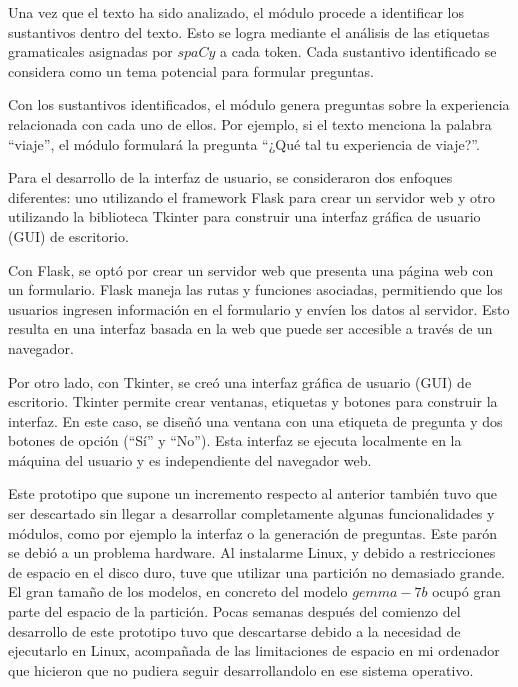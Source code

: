 Una vez que el texto ha sido analizado, el módulo procede a identificar los sustantivos dentro del texto. Esto se logra mediante el análisis de las etiquetas gramaticales asignadas por $spaCy$ a cada token. Cada sustantivo identificado se considera como un tema potencial para formular preguntas.

Con los sustantivos identificados, el módulo genera preguntas sobre la experiencia relacionada con cada uno de ellos. Por ejemplo, si el texto menciona la palabra ``viaje'', el módulo formulará la pregunta ``¿Qué tal tu experiencia de viaje?''.

Para el desarrollo de la interfaz de usuario, se consideraron dos enfoques diferentes: uno utilizando el framework Flask para crear un servidor web y otro utilizando la biblioteca Tkinter para construir una interfaz gráfica de usuario (GUI) de escritorio.

Con Flask, se optó por crear un servidor web que presenta una página web con un formulario. Flask maneja las rutas y funciones asociadas, permitiendo que los usuarios ingresen información en el formulario y envíen los datos al servidor. Esto resulta en una interfaz basada en la web que puede ser accesible a través de un navegador.

Por otro lado, con Tkinter, se creó una interfaz gráfica de usuario (GUI) de escritorio. Tkinter permite crear ventanas, etiquetas y botones para construir la interfaz. En este caso, se diseñó una ventana con una etiqueta de pregunta y dos botones de opción (``Sí'' y ``No''). Esta interfaz se ejecuta localmente en la máquina del usuario y es independiente del navegador web.

Este prototipo que supone un incremento respecto al anterior también tuvo que ser descartado sin llegar a desarrollar completamente algunas funcionalidades y módulos, como por ejemplo la interfaz o la generación de preguntas. Este parón se debió a un problema hardware. Al instalarme Linux, y debido a restricciones de espacio en el disco duro, tuve que utilizar una partición no demasiado grande. El gran tamaño de los modelos, en concreto del modelo $gemma-7b$ ocupó gran parte del espacio de la partición. Pocas semanas después del comienzo del desarrollo de este prototipo tuvo que descartarse debido a la necesidad de ejecutarlo en Linux, acompañada de las limitaciones de espacio en mi ordenador que hicieron que no pudiera seguir desarrollandolo en ese sistema operativo. 

